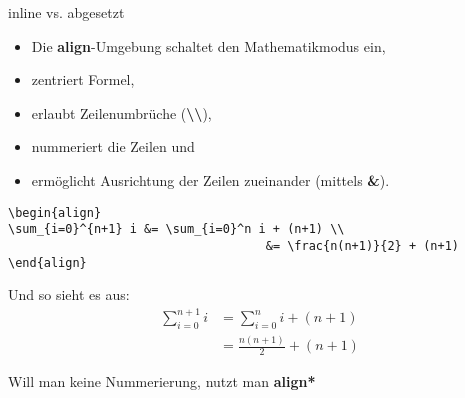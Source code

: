 \begin{frame}[fragile]{inline vs. abgesetzt}
\begin{itemize}
\item Die \textbf{align}-Umgebung schaltet den Mathematikmodus ein,
\item zentriert Formel,
\item erlaubt Zeilenumbrüche (\textbf{\textbackslash\textbackslash}),
\item nummeriert die Zeilen und
\item ermöglicht Ausrichtung der Zeilen zueinander (mittels \textbf{\&}).
\end{itemize}

\begin{lstlisting}[style=tex]
\begin{align}
\sum_{i=0}^{n+1} i &= \sum_{i=0}^n i + (n+1) \\
                                    &= \frac{n(n+1)}{2} + (n+1)
\end{align}
\end{lstlisting}

\pause Und so sieht es aus:
\begin{align}
\sum_{i=0}^{n+1} i &= \sum_{i=0}^n i + (n+1) \\
                       &= \frac{n(n+1)}{2} + (n+1)
\end{align}\pause

Will man keine Nummerierung, nutzt man \textbf{align*}
\end{frame}

